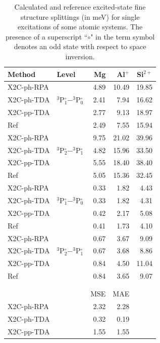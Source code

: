 \begin{table}[htbp]
  \caption{Calculated and reference \cite{NIST_ASD} excited-state fine structure splittings (in meV) for 
  single excitations of some atomic systems. The presence of a superscript ``$\circ$" in the term symbol 
  denotes an odd state with respect to space inversion.}
 \label{tb:SingleEx}
 \centering
 \begin{tabular}{llrrr}
  \hline
  Method     & Level                                              &  Mg   & Al$^+$ & Si$^{2+}$ \\ \hline
  X2C-ph-RPA & \multirow{3}{*}{$^3$P$^\circ_{1}-^3$P$^\circ_{0}$} &  4.89 & 10.49  & 19.85 \\
  X2C-ph-TDA &                                                    &  2.41 &  7.94  & 16.62 \\
  X2C-pp-TDA &                                                    &  2.77 &  9.13  & 18.97 \\
  Ref        &                                                    &  2.49 &  7.55  & 15.94 \\
  \hline
  X2C-ph-RPA & \multirow{3}{*}{$^3$P$^\circ_{2}-^3$P$^\circ_{1}$} &  9.75 & 21.02  & 39.96 \\
  X2C-ph-TDA &                                                    &  4.82 & 15.96  & 33.50 \\
  X2C-pp-TDA &                                                    &  5.55 & 18.40  & 38.40 \\
  Ref        &                                                    &  5.05 & 15.36  & 32.45 \\
  \hline
  X2C-ph-RPA & \multirow{3}{*}{$^3$P$^\circ_{1}-^3$P$^\circ_{0}$} &  0.33 &  1.82  &  4.43 \\
  X2C-ph-TDA &                                                    &  0.33 &  1.82  &  4.31 \\
  X2C-pp-TDA &                                                    &  0.42 &  2.17  &  5.08 \\
  Ref        &                                                    &  0.41 &  1.73  &  4.10 \\
  \hline
  X2C-ph-RPA & \multirow{3}{*}{$^3$P$^\circ_{2}-^3$P$^\circ_{1}$} &  0.67 &  3.67  &  9.09 \\
  X2C-ph-TDA &                                                    &  0.67 &  3.68  &  8.86 \\
  X2C-pp-TDA &                                                    &  0.84 &  4.50  & 11.04 \\
  Ref        &                                                    &  0.84 &  3.65  &  9.07 \\ 
  \hline
  \\
  \\
             &  &  MSE  &  MAE   & \\
  \hline
  X2C-ph-RPA &  &  2.32 &  2.28  & \\
  X2C-ph-TDA &  &  0.32 &  0.19  & \\
  X2C-pp-TDA &  &  1.55 &  1.55  & \\
  \hline
 \end{tabular}
\end{table}

